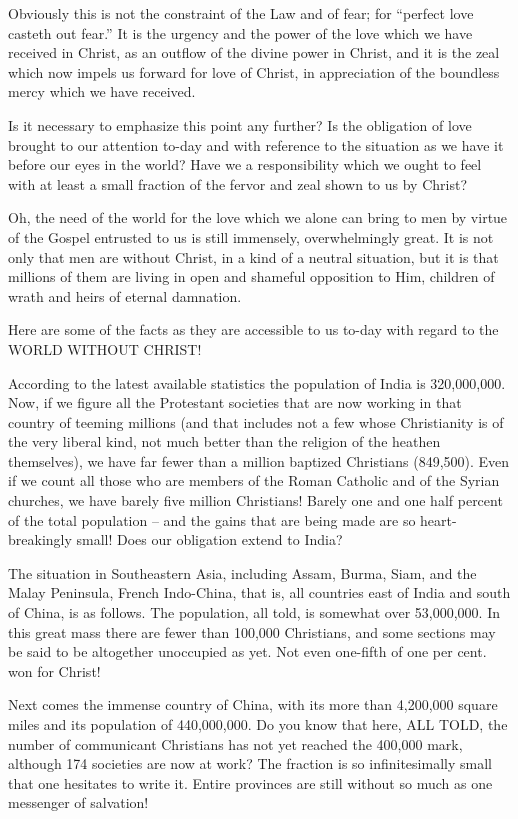 \documentclass[
]{book}
\begin{document}
Obviously this is not the constraint of the Law and of fear; for ``perfect love casteth out fear.'' It is the urgency and the power of the love which we have received in Christ, as an outflow of the divine power in Christ, and it is the zeal which now impels us forward for love of Christ, in appreciation of the boundless mercy which we have received.

Is it necessary to emphasize this point any further? Is the obligation of love brought to our attention to-day and with reference to the situation as we have it before our eyes in the world? Have we a responsibility which we ought to feel with at least a small fraction of the fervor and zeal shown to us by Christ?

Oh, the need of the world for the love which we alone can bring to men by virtue of the Gospel entrusted to us is still immensely, overwhelmingly great. It is not only that men are without Christ, in a kind of a neutral situation, but it is that millions of them are living in open and shameful opposition to Him, children of wrath and heirs of eternal damnation.

Here are some of the facts as they are accessible to us to-day with regard to the WORLD WITHOUT CHRIST!

According to the latest available statistics the population of India is 320,000,000. Now, if we figure all the Protestant societies that are now working in that country of teeming millions (and that includes not a few whose Christianity is of the very liberal kind, not much better than the religion of the heathen themselves), we have far fewer than a million baptized Christians (849,500). Even if we count all those who are members of the Roman Catholic and of the Syrian churches, we have barely five million Christians! Barely one and one half percent of the total population -- and the gains that are being made are so heart-breakingly small! Does our obligation extend to India?

The situation in Southeastern Asia, including Assam, Burma, Siam, and the Malay Peninsula, French Indo-China, that is, all countries east of India and south of China, is as follows. The population, all told, is somewhat over 53,000,000. In this great mass there are fewer than 100,000 Christians, and some sections may be said to be altogether unoccupied as yet. Not even one-fifth of one per cent. won for Christ!

Next comes the immense country of China, with its more than 4,200,000 square miles and its population of 440,000,000. Do you know that here, ALL TOLD, the number of communicant Christians has not yet reached the 400,000 mark, although 174 societies are now at work? The fraction is so infinitesimally small that one hesitates to write it. Entire provinces are still without so much as one messenger of salvation!
\end{document}
